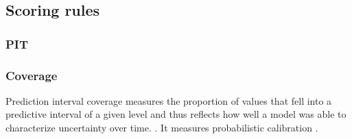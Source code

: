 \subsection{Scoring rules}
\subsubsection{PIT}
\subsubsection{Coverage}
Prediction interval coverage measures the proportion of values that fell into a predictive interval of a given level and thus reflects how well a model was able to characterize uncertainty over time.\citep{cramer_evaluation_nodate} . It measures probabilistic calibration \citep{bosse_evaluating_2022}.
